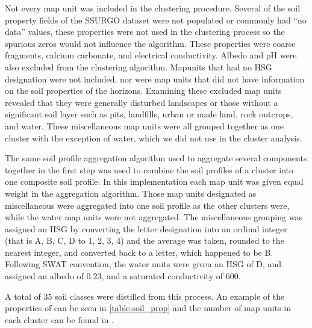 Not every map unit was included in the clustering procedure. Several of the soil property fields of the SSURGO dataset were not populated or commonly had ``no data'' values, these properties were not used in the
clustering process so the spurious zeros would not influence the algorithm. These properties were coarse fragments, calcium carbonate, and electrical conductivity. Albedo and pH were also excluded from the clustering algorithm. Mapunits that had no HSG designation were not included, nor were map units that did not have information on the soil properties of the horizons. Examining these excluded map units revealed that they were generally disturbed landscapes or those without a significant soil layer such as pits, landfills, urban or made land, rock outcrops, and water. These miscellaneous map units were all grouped together as one cluster with the exception of water, which we did not use in the cluster analysis.

The same soil profile aggregation algorithm \citep{beaudette_algorithms_2013}
used to aggregate several components together in the first step was used to combine the soil profiles of a cluster into one
composite soil profile. In this implementation each map unit was given equal
weight in the aggregation algorithm. Those map units designated as miscellaneous
were aggregated into one soil profile as the other clusters were, while the
water map units were not aggregated. The miscellaneous grouping was assigned an
HSG by converting the letter designation into an ordinal
integer (that is A, B, C, D to 1, 2, 3, 4) and the average was taken, rounded to
the nearest integer, and converted back to a letter, which happened to be B. Following SWAT convention, the water units
were given an HSG of D, and assigned an albedo of 0.23, and a saturated conductivity
of 600.

A total of 35 soil classes were distilled from this process. An example of the properties of can be seen in \ref{table:soil_prop} and the number of map units in each cluster can be found in .

